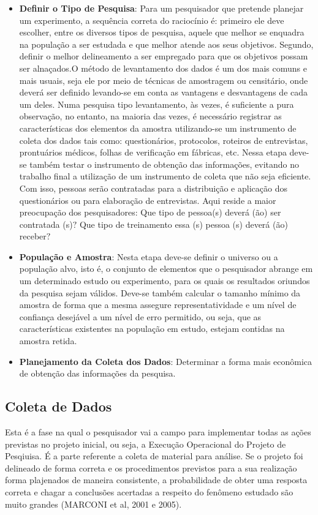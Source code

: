 \begin{itemize}
\item \textbf{Definir o Tipo de Pesquisa}: Para um pesquisador que pretende planejar um experimento, a sequência correta do raciocínio é: primeiro ele deve escolher, entre os diversos tipos de pesquisa, aquele que melhor se enquadra na população a ser estudada e que melhor atende aos seus objetivos. Segundo, definir o melhor delineamento a ser empregado para que os objetivos possam ser alnaçados.O método de levantamento dos dados é um dos mais comuns e mais usuais, seja ele por meio de técnicas de amostragem ou censitário, onde deverá ser definido levando-se em conta as vantagens e desvantagens de cada um deles. Numa pesquisa tipo levantamento, às vezes, é suficiente a pura observação, no entanto, na maioria das vezes, é necessário registrar as características dos elementos da amostra utilizando-se um instrumento de coleta dos dados tais como: questionários, protocolos, roteiros de entrevistas, prontuários médicos, folhas de verificação em fábricas, etc. Nessa etapa deve-se também testar o instrumento de obtenção das informações, evitando no trabalho final a utilização de um instrumento de coleta que não seja eficiente. Com isso, pessoas serão contratadas para a distribuição e aplicação dos questionários ou para elaboração de entrevistas. Aqui reside a maior preocupação dos pesquisadores: Que tipo de pessoa(s) deverá (ão) ser contratada (s)$?$ Que tipo de treinamento essa (s) pessoa (s) deverá (ão) receber$?$
   \item \textbf{População e Amostra}: Nesta etapa deve-se definir o universo ou a população alvo, isto é, o conjunto de elementos que o pesquisador abrange em um determinado estudo ou experimento, para os quais os resultados oriundos da pesquisa sejam válidos. Deve-se também calcular o tamanho mínimo da amostra de forma que a mesma assegure representatividade e um nível de confiança desejável a um nível de erro permitido, ou seja, que as características existentes na população em estudo, estejam contidas na amostra retida.
   \item \textbf{Planejamento da Coleta dos Dados}: Determinar a forma mais e\-co\-nô\-mi\-ca de obtenção das informações da pesquisa.
 \end{itemize}


\subsection{Coleta de Dados}

Esta é a fase na qual o pesquisador vai a campo para implementar
todas as ações previstas no projeto inicial, ou seja, a Execução Operacional do Projeto de Pesqiuisa. É a parte referente a
coleta de material para análise. Se o projeto foi delineado de
forma correta e os procedimentos previstos para a sua realização
forma plajenados de maneira consistente, a probabilidade de obter
uma resposta correta e chagar a conclusões acertadas a respeito do
fenômeno estudado são muito grandes (MARCONI et al, 2001 e 2005).\vskip0.3cm


